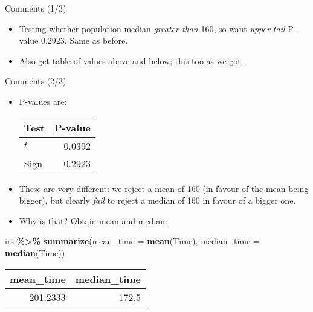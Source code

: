 \documentclass[
  ignorenonframetext,
]{beamer}
\newenvironment{Shaded}{\begin{snugshade}}{\end{snugshade}}
\newcommand{\DataTypeTok}[1]{\textcolor[rgb]{0.13,0.29,0.53}{#1}}
\newcommand{\KeywordTok}[1]{\textcolor[rgb]{0.13,0.29,0.53}{\textbf{#1}}}
\newcommand{\NormalTok}[1]{#1}
\newcommand{\OperatorTok}[1]{\textcolor[rgb]{0.81,0.36,0.00}{\textbf{#1}}}
\newcommand{\StringTok}[1]{\textcolor[rgb]{0.31,0.60,0.02}{#1}}
\providecommand{\tightlist}{%
  \setlength{\itemsep}{0pt}\setlength{\parskip}{0pt}}
\begin{document}
\begin{frame}{Comments (1/3)}
\protect\hypertarget{comments-13}{}
\begin{itemize}
\tightlist
\item
  Testing whether population median \emph{greater than} 160, so want
  \emph{upper-tail} P-value 0.2923. Same as before.
\item
  Also get table of values above and below; this too as we got.
\end{itemize}
\end{frame}

\begin{frame}[fragile]{Comments (2/3)}
\protect\hypertarget{comments-23}{}
\begin{itemize}
\tightlist
\item
  P-values are:

  \begin{center}
    \begin{tabular}{lr}
      Test & P-value\\
      \hline
      $t$ & 0.0392\\
      Sign & 0.2923\\
      \hline
    \end{tabular}

    \end{center}
\item
  These are very different: we reject a mean of 160 (in favour of the
  mean being bigger), but clearly \emph{fail} to reject a median of 160
  in favour of a bigger one.
\item
  Why is that? Obtain mean and median:
\end{itemize}

\begin{Shaded}
\begin{Highlighting}[]
\NormalTok{irs }\OperatorTok{\%\textgreater{}\%}\StringTok{ }\KeywordTok{summarize}\NormalTok{(}\DataTypeTok{mean\_time =} \KeywordTok{mean}\NormalTok{(Time), }
                  \DataTypeTok{median\_time =} \KeywordTok{median}\NormalTok{(Time))}
\end{Highlighting}
\end{Shaded}

\begin{longtable}[]{@{}rr@{}}
\toprule
mean\_time & median\_time\tabularnewline
\midrule
\endhead
201.2333 & 172.5\tabularnewline
\bottomrule
\end{longtable}
\end{frame}
\end{document}

